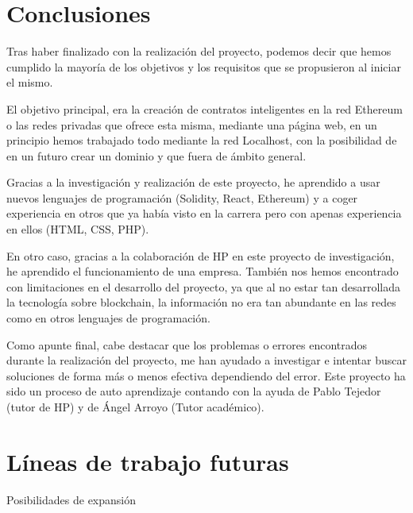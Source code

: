 
\section{Conclusiones}

Tras haber finalizado con la realización del proyecto, podemos decir que hemos cumplido la mayoría de los objetivos y los requisitos que se propusieron al iniciar el mismo.

El objetivo principal, era la creación de contratos inteligentes en la red Ethereum o las redes privadas que ofrece esta misma, mediante una página web, en un principio hemos trabajado todo mediante la red Localhost, con la posibilidad de en un futuro crear un dominio y que fuera de ámbito general.

Gracias a la investigación y realización de este proyecto, he aprendido a usar nuevos lenguajes de programación (Solidity, React, Ethereum) y a coger experiencia en otros que ya había visto en la carrera pero con apenas experiencia en ellos (HTML, CSS, PHP). 

En otro caso, gracias a la colaboración de HP en este proyecto de investigación, he aprendido el funcionamiento de una empresa. También nos hemos encontrado con limitaciones en el desarrollo del proyecto, ya que al no estar tan desarrollada la tecnología sobre blockchain, la información no era tan abundante en las redes como en otros lenguajes de programación.

Como apunte final, cabe destacar que los problemas o errores encontrados durante la realización del proyecto, me han ayudado a investigar e intentar buscar soluciones de forma más o menos efectiva dependiendo del error. Este proyecto ha sido un proceso de auto aprendizaje contando con la ayuda de Pablo Tejedor (tutor de HP) y de Ángel Arroyo (Tutor académico).  

\section{Líneas de trabajo futuras}

Posibilidades de expansión

